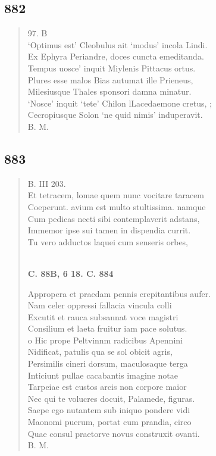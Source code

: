 \documentclass[11pt, a4paper]{report}
\begin{document}
            \subsection*{882}
      \begin{verse}
      97. B \\ ‘Optimus est’ Cleobulus ait ‘modus’ incola Lindi. \\ Ex Ephyra Periandre, doces cuncta emeditanda. \\ Tempus uosce’ inquit Miylenis Pittacus ortus. \\ Plures esse malos Bias autumat ille Prieneus, \\ Milesiusque Thales sponsori damna minatur. \\ ‘Nosce’ inquit ‘tete’ Chilon lLacedaemone cretus, ; \\ Cecropiusque Solon ‘ne quid nimis’ induperavit. \\ B. M. \\ 
      \end{verse}
  
            \subsection*{883}
      \begin{verse}
      B. III 203. \\ Et tetracem, lomae quem nunc vocitare taracem \\ Coeperunt. avium est multo stultissima. namque \\ Cum pedicas necti sibi contemplaverit adstans, \\ Immemor ipse sui tamen in dispendia currit. \\ Tu vero adductos laquei cum senseris orbes, \\ 
        ﻿\pagebreak 
    \begin{center} \textbf{C. 88B, 6 18. C. 884} \end{center}Appropera et praedam pennis crepitantibus aufer. \\ Nam celer oppressi fallacia vincula colli \\ Excutit et rauca subsannat voce magistri \\ Consilium et laeta fruitur iam pace solutus. \\ o Hic prope Peltvinnm radicibus Apennini \\ Nidificat, patulis qua se sol obicit agris, \\ Persimilis cineri dorsum, maculosaque terga \\ Inticiunt pullae cacabantis imagine notae \\ Tarpeiae est custos arcis non corpore maior \\ Nec qui te volucres docuit, Palamede, figuras. \\ Saepe ego nutantem sub iniquo pondere vidi \\ Maonomi puerum, portat cum prandia, circo \\ Quae consul praetorve novus construxit ovanti. \\ B. M. \\ 
      \end{verse}
  
\end{document}

